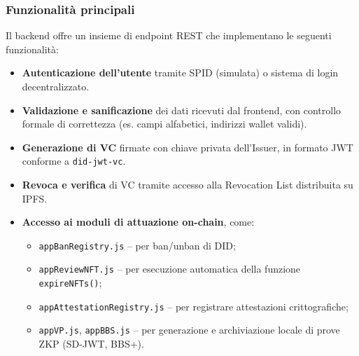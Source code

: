             \subsubsection{Funzionalità principali}  
                \noindent Il backend offre un insieme di endpoint REST che implementano le seguenti funzionalità:
                    \begin{itemize}
                        \item \textbf{Autenticazione dell’utente} tramite SPID (simulata) o sistema di login decentralizzato.

                        \item \textbf{Validazione e sanificazione} dei dati ricevuti dal frontend, con controllo formale di correttezza (es. campi alfabetici, indirizzi wallet validi).
                        
                        \item \textbf{Generazione di VC} firmate con chiave privata dell’Issuer, in formato JWT conforme a \texttt{did-jwt-vc}.
                        
                        \item \textbf{Revoca e verifica} di VC tramite accesso alla Revocation List distribuita su IPFS.
                        
                        \item \textbf{Accesso ai moduli di attuazione on-chain}, come:
                            \begin{itemize}
                                \item \texttt{appBanRegistry.js} – per ban/unban di DID;
                                
                                \item \texttt{appReviewNFT.js} – per esecuzione automatica della funzione \texttt{expireNFTs()};
                                
                                \item \texttt{appAttestationRegistry.js} – per registrare attestazioni crittografiche;
                                                                
                                \item \texttt{appVP.js}, \texttt{appBBS.js} – per generazione e archiviazione locale di prove ZKP (SD-JWT, BBS+).
                            \end{itemize}
                    \end{itemize}
            
